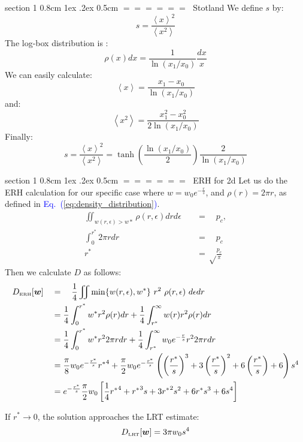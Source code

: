 \documentclass[onecolumn,fleqn,notitlepage,secnumarabic]{revtex4}
\makeatletter
\newcommand{\tbox}[1]{\mbox{\tiny #1}}
\newcommand{\beq}{\begin{eqnarray}}
\newcommand{\eeq}{\end{eqnarray}}
\newcommand{\Eq}[1]{\textcolor{blue}{Eq.\!\!~(\ref{#1})}}
\newcommand{\avgangle}[1]{\left\langle #1 \right\rangle} %
\def\section{%
  \@startsection
    {section}%
    {1}%
    {\z@}%
    {0.8cm \@plus1ex \@minus .2ex}%
    {0.5cm}%
    {\Large\bf $=\!=\!=\!=\!=\!=\;$}%
}%
\makeatother
\begin{document}



%


\section{Stotland}
We define $s$ by:
\[ s = \frac{\avgangle{x}^2}{\avgangle{x^2}} \]
The log-box distribution is :
\[ \rho(x)dx = \frac{1}{\ln(x_1/x_0)} \frac{dx}{x}\]
We can easily calculate:
\[ \avgangle{x} = \frac{x_1-x_0}{\ln(x_1/x_0)}\]
and:
\[ \avgangle{x^2} = \frac{x_1^2-x_0^2}{2\ln(x_1/x_0)}\]
Finally:
\[ s= \frac{\avgangle{x}^2}{\avgangle{x^2}} = \tanh\left(\frac{\ln(x_1/x_0)}{2}\right)\frac{2}{\ln(x_1/x_0)}\]

\section{ERH for 2d}\label{sec:ERH_2d}
Let us do the ERH calculation for our specific case 
where $w =w_0 e^{-\frac{r}{s}}$, and $\rho(r) = 2\pi r$,  
as defined in \Eq{eq:density_distribution}.
%
\begin{align}
\iint_{w(r,\epsilon)>w*} \rho(r,\epsilon)drd\epsilon \quad &= \quad p_c, \\
\int_0^{r^*} 2\pi r dr \quad &=\quad p_c \\
r^*  &= \sqrt\frac{p_c}{\pi}
\end{align}
%
Then we calculate $D$ as follows:
%
\begin{align}
D_{\tbox{ERH}}[\bm{w}] \quad&=\quad \frac{1}{4}\iint \min\{w(r,\epsilon),w^*\} \ r^2  \ \rho(r,\epsilon) \ d\epsilon dr \\
&= \frac{1}{4}\int_0^{r^*} w^* r^2\rho(r) dr  + \frac{1}{4}\int_{r^*}^\infty w(r) r^2\rho(r)dr \\
&= \frac{1}{4}\int_0^{r^*} w^* r^2 2\pi rdr  + \frac{1}{4}\int_{r^*}^\infty w_0e^{-\frac{r}{s}} r^2 2\pi rdr \\
&=  \frac{\pi}{8}w_0 e^{-\frac{r^*}{s}}{r^*}^4 + \frac{\pi}{2} w_0  e^{-\frac{r^*}{s}}\left( \left(\frac{r^*}{s}\right)^3 + 3\left(\frac{r^*}{s}\right)^2 + 6\left(\frac{r^*}{s}\right) +6 \right) s^4 \\
&=  e^{-\frac{r^*}{s}}\frac{\pi}{2} w_0\left[\frac{1}{4}{r^*}^4 +  {r^*}^3 s + 3{r^*}^2 s^2 + 6r^*s^3 +6 s^4  \right]
\end{align}

%
If $r^* \rightarrow 0$, the solution approaches the LRT estimate: 
%
\beq
D_{\tbox{LRT}}[\bm{w}] = 3\pi w_0 s^4 
\eeq
\end{document}
